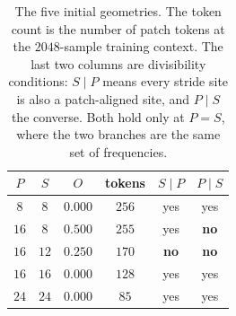 \begin{table}[!b]
    \centering
    \small
    \begin{tabular}{@{}cccccc@{}}
        \toprule
        $P$ & $S$ & $O$ & \textbf{tokens} & $S \mid P$ & $P \mid S$ \\
        \midrule
        $8$ & $8$ & $0.000$ & $256$ & yes & yes \\
        \midrule
        $16$ & $8$ & $0.500$ & $255$ & yes & \textbf{no} \\
        $16$ & $12$ & $0.250$ & $170$ & \textbf{no} & \textbf{no} \\
        $16$ & $16$ & $0.000$ & $128$ & yes & yes \\
        \midrule
        $24$ & $24$ & $0.000$ & $85$ & yes & yes \\
        \bottomrule
    \end{tabular}
    \caption{The five initial geometries. The token count is the number of patch tokens at the $2048$-sample training context. The last two columns are divisibility conditions: $S \mid P$ means every stride site is also a patch-aligned site, and $P \mid S$ the converse. Both hold only at $P=S$, where the two branches are the same set of frequencies.}
    \label{tab:patchStride}
\end{table}
